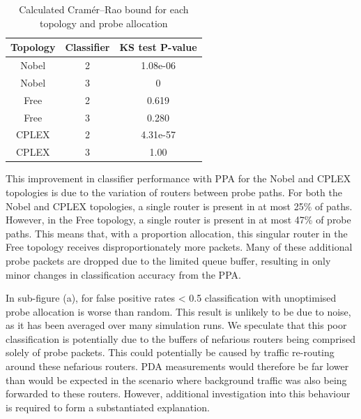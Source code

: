 \begin{table}[H]
 \centering
  \begin{tabular}{@{}ccc@{}}
   \toprule
    Topology & Classifier & KS test P-value \\
    \midrule
    Nobel & 2 & 1.08e-06\\
    Nobel & 3 & 0\\
    Free  & 2 & 0.619\\
    Free  & 3 & 0.280\\
    CPLEX & 2 & 4.31e-57\\
    CPLEX & 3 & 1.00\\
   \bottomrule
  \end{tabular}
  \caption{Calculated Cramér–Rao bound for each topology and probe allocation}
  \label{tbl:Roptkstest}
\end{table}
This improvement in classifier performance with PPA for the Nobel and CPLEX topologies is due to the variation of routers between probe paths. For both the Nobel and CPLEX topologies, a single router is present in at most 25\% of paths. However, in the Free topology, a single router is present in at most 47\% of probe paths. This means that, with a proportion allocation, this singular router in the Free topology receives disproportionately more packets. Many of these additional probe packets are dropped due to the limited queue buffer, resulting in only minor changes in classification accuracy from the PPA.\par
In sub-figure (a), for false positive rates < 0.5 classification with unoptimised probe allocation is worse than random. This result is unlikely to be due to noise, as it has been averaged over many simulation runs. We speculate that this poor classification is potentially due to the buffers of nefarious routers being comprised solely of probe packets. This could potentially be caused by traffic re-routing around these nefarious routers. PDA measurements would therefore be far lower than would be expected in the scenario where background traffic was also being forwarded to these routers. However, additional investigation into this behaviour is required to form a substantiated explanation.

